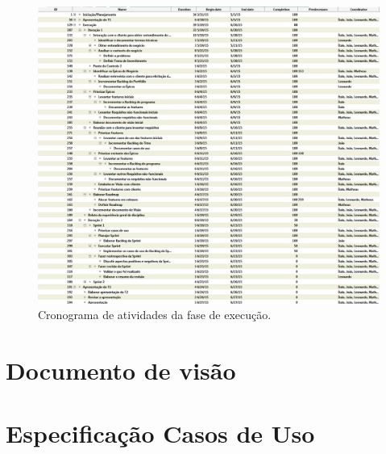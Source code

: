 \begin{apendicesenv}
    \label{cronograma_execucao}
      \begin{figure}[!htbp]
	\centering
	\includegraphics[scale=0.5]{figuras/cronograma.png}
	\caption[Cronograma de atividades da fase de execução]
	    {Cronograma de atividades da fase de execução.}
	\label{cronograma}
      \end{figure}
  
  \chapter{Documento de visão}
    \label{doc_visao}

    


  \chapter{Especificação Casos de Uso}
  \label{Especificacao}
  

    \label{Especificacao}
    
    
    
    
    
    
    
    
    
    
    
    
    
  
  
\end{apendicesenv}
